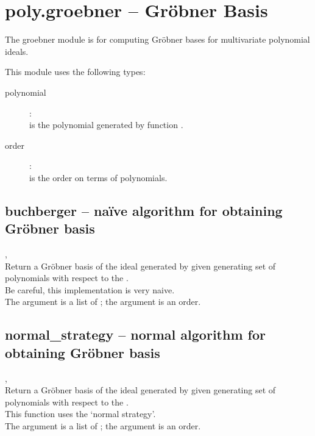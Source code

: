 


 \section{poly.groebner -- Gr\"obner Basis}
 The groebner module is for computing Gr\"obner bases for multivariate polynomial ideals.


 This module uses the following types:
 \begin{description}
   \item[polynomial]:\\
      is the polynomial generated by function . 
   \item[order]:\\
      is the order on terms of polynomials. 
 \end{description}

%
  \subsection{buchberger -- na\"ive algorithm for obtaining Gr\"obner basis}
   {%
     ,\ %
   }{%
     \out{[polynomials]}%
   }\\
   \spacing
   Return a Gr\"obner basis of the ideal generated by given generating
   set of polynomials with respect to the .\\
   \spacing
   Be careful, this implementation is very naive.\\
   \spacing
   The argument  is a list of ;
   the argument  is an order.
%
  \subsection{normal\_strategy -- normal algorithm for obtaining Gr\"obner basis}
   {%
     ,\ %
   }
   {%
     \out{[polynomials]}}\\
   \spacing
   Return a Gr\"obner basis of the ideal generated by given generating
   set of polynomials with respect to the .\\
   \spacing
    This function uses the `normal strategy'. \\
   \spacing
   The argument  is a list of ;
   the argument  is an order.
   \\
%
